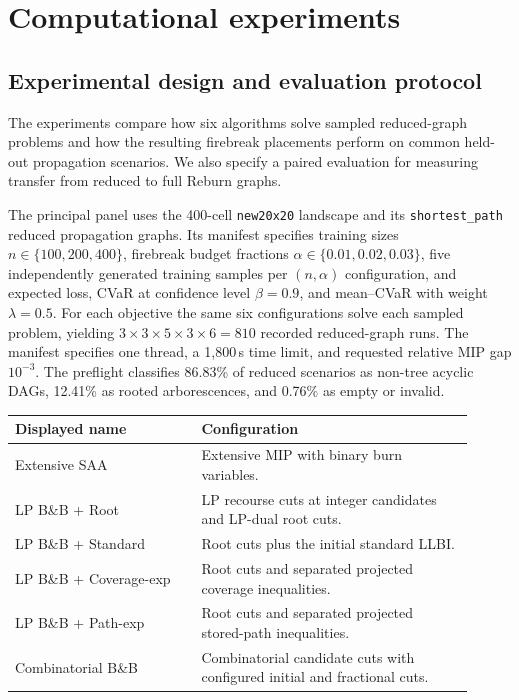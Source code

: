 \section{Computational experiments}\label{sec:computational}

\subsection{Experimental design and evaluation protocol}\label{sec:compared}

The experiments compare how six algorithms solve sampled reduced-graph
problems and how the resulting firebreak placements perform on common
held-out propagation scenarios. We also specify a paired evaluation
for measuring transfer from reduced to full Reburn graphs.

The principal panel uses the 400-cell \texttt{new20x20} landscape and
its \texttt{shortest\_path} reduced propagation graphs. Its manifest
specifies training sizes $n\in\{100,200,400\}$, firebreak budget
fractions $\alpha\in\{0.01,0.02,0.03\}$, five independently generated
training samples per $(n,\alpha)$ configuration, and expected loss,
CVaR at confidence level $\beta=0.9$, and mean--CVaR with weight
$\lambda=0.5$. For each objective the same six configurations solve
each sampled problem, yielding $3\times3\times5\times3\times6=810$
recorded reduced-graph runs. The manifest specifies one thread, a
1,800\,s time limit, and requested relative MIP gap $10^{-3}$. The
preflight classifies 86.83\% of reduced scenarios as non-tree acyclic
DAGs, 12.41\% as rooted arborescences, and 0.76\% as empty or invalid.

\begin{center}
\begin{minipage}{0.96\linewidth}\centering\small
{}
\label{tab:methods}
\begin{tabular}{p{0.37\linewidth}p{0.54\linewidth}}
\toprule
Displayed name & Configuration \\
\midrule
Extensive SAA & Extensive MIP with binary burn variables. \\
LP B\&B + Root & LP recourse cuts at integer candidates and LP-dual root cuts. \\
LP B\&B + Standard & Root cuts plus the initial standard LLBI. \\
LP B\&B + Coverage-exp & Root cuts and separated projected coverage inequalities. \\
LP B\&B + Path-exp & Root cuts and separated projected stored-path inequalities. \\
Combinatorial B\&B & Combinatorial candidate cuts with configured initial and fractional cuts. \\
\bottomrule
\end{tabular}
\end{minipage}
\end{center}

